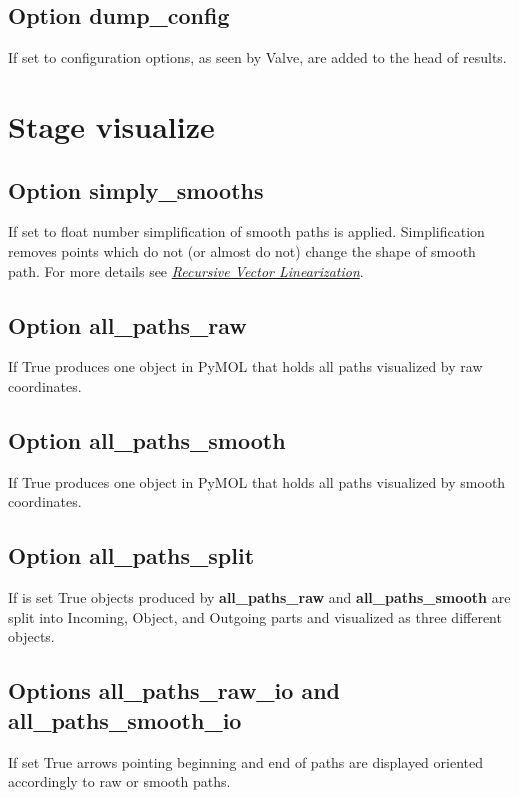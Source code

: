 \documentclass[a4paper,10pt,english]{sphinxmanual}
\begin{document}
\subsection{Option \textbf{dump\_config}}
\label{valve/valve_config:option-dump-config}
If set to  configuration options, as seen by Valve, are added to the head of results.


\section{Stage \textbf{visualize}}
\label{valve/valve_config:stage-visualize}

\subsection{Option \textbf{simply\_smooths}}
\label{valve/valve_config:option-simply-smooths}
If set to float number simplification of smooth paths is applied.
Simplification removes points which do not (or almost do not) change the shape of smooth path. For more details see {\hyperref[aqueduct.geom.traces:simply-smooths-details]{\emph{Recursive Vector Linearization}}}.


\subsection{Option \textbf{all\_paths\_raw}}
\label{valve/valve_config:option-all-paths-raw}
If True produces one object in PyMOL that holds all paths visualized by raw coordinates.


\subsection{Option \textbf{all\_paths\_smooth}}
\label{valve/valve_config:option-all-paths-smooth}
If True produces one object in PyMOL that holds all paths visualized by smooth coordinates.


\subsection{Option \textbf{all\_paths\_split}}
\label{valve/valve_config:option-all-paths-split}
If is set True objects produced by \textbf{all\_paths\_raw} and \textbf{all\_paths\_smooth} are split into Incoming, Object, and Outgoing parts and visualized as three different objects.


\subsection{Options \textbf{all\_paths\_raw\_io} and \textbf{all\_paths\_smooth\_io}}
\label{valve/valve_config:options-all-paths-raw-io-and-all-paths-smooth-io}
If set True arrows pointing beginning and end of paths are displayed oriented accordingly to raw or smooth paths.
\end{document}
